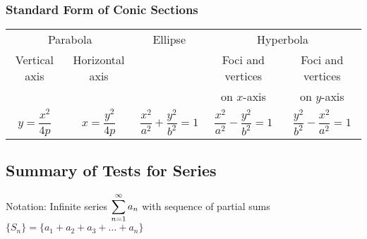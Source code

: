 \vfill


\subsubsection*{Standard Form of Conic Sections}

{\addtolength{\tabcolsep}{6pt}
\begin{tabular}{ c c c c c }
\multicolumn{2}{c}{Parabola} & \hspace{5em}Ellipse\hspace{5em} & \multicolumn{2}{c}{Hyperbola} \\
Vertical axis & Horizontal axis & & Foci and vertices & Foci and vertices \\
& & & on $x$-axis & on $y$-axis \\
$y=\dfrac{x^2}{4p}$ & $x=\dfrac{y^2}{4p}$ & $\dfrac{x^2}{a^2}+\dfrac{y^2}{b^2}=1$ & $\dfrac{x^2}{a^2}-\dfrac{y^2}{b^2}=1$ & $\dfrac{y^2}{b^2}-\dfrac{x^2}{a^2}=1$
\end{tabular}}

\clearpage

\subsection{Summary of Tests for Series}\label{tab_series_tests}

Notation: Infinite series $\displaystyle\sum_{n=1}^\infty a_n$ with sequence of partial sums $\{S_n\}=\{a_1+a_2+a_3+\dots+a_n\}$

